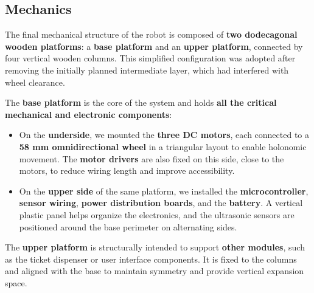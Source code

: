 \subsection{Mechanics}

The final mechanical structure of the robot is composed of \textbf{two dodecagonal wooden platforms}: a \textbf{base platform} and an \textbf{upper platform}, connected by four vertical wooden columns. This simplified configuration was adopted after removing the initially planned intermediate layer, which had interfered with wheel clearance.

The \textbf{base platform} is the core of the system and holds \textbf{all the critical mechanical and electronic components}:

\begin{itemize}
    \item On the \textbf{underside}, we mounted the \textbf{three DC motors}, each connected to a \textbf{58 mm omnidirectional wheel} in a triangular layout to enable holonomic movement. The \textbf{motor drivers} are also fixed on this side, close to the motors, to reduce wiring length and improve accessibility.
    \item On the \textbf{upper side} of the same platform, we installed the \textbf{microcontroller}, \textbf{sensor wiring}, \textbf{power distribution boards}, and the \textbf{battery}. A vertical plastic panel helps organize the electronics, and the ultrasonic sensors are positioned around the base perimeter on alternating sides.
\end{itemize}

The \textbf{upper platform} is structurally intended to support \textbf{other modules}, such as the ticket dispenser or user interface components. It is fixed to the columns and aligned with the base to maintain symmetry and provide vertical expansion space.


